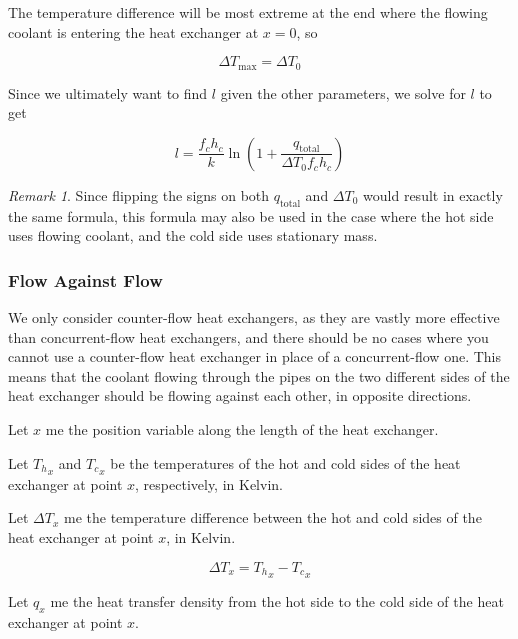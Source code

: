 \documentclass{article}
\numberwithin{equation}{subsection}
\theoremstyle{remark}
\newtheorem*{remark}{Remark}
\newcommand{\qtotal}{q_{\mathrm{total}}}
\newcommand{\DeltaT}{\Delta{}T}
\newcommand{\DeltaTmax}{\DeltaT_{\mathrm{max}}}
\begin{document}
The temperature difference will be most extreme at the end where the flowing coolant is entering the heat exchanger at \(x = 0\), so

\begin{equation}
\DeltaTmax = \DeltaT_{0}
\end{equation}

Since we ultimately want to find \(l\) given the other parameters, we solve for \(l\) to get

\begin{equation}
l = \frac{f_{c} h_{c}}{k} \ln \left(1 + \frac{\qtotal}{\DeltaT_{0} f_{c} h_{c}}\right)
\end{equation}

\begin{remark}
Since flipping the signs on both \(\qtotal\) and \(\DeltaT_{0}\) would result in exactly the same formula, this formula may also be used in the case where the hot side uses flowing coolant, and the cold side uses stationary mass.
\end{remark}

\subsubsection{Flow Against Flow}

We only consider counter-flow heat exchangers, as they are vastly more effective than concurrent-flow heat exchangers, and there should be no cases where you cannot use a counter-flow heat exchanger in place of a concurrent-flow one.
This means that the coolant flowing through the pipes on the two different sides of the heat exchanger should be flowing against each other, in opposite directions.

Let \(x\) me the position variable along the length of the heat exchanger.

Let \({T_{h}}_{x}\) and \({T_{c}}_{x}\) be the temperatures of the hot and cold sides of the heat exchanger at point \(x\), respectively, in Kelvin.

Let \(\DeltaT_{x}\) me the temperature difference between the hot and cold sides of the heat exchanger at point \(x\), in Kelvin.

\begin{equation}
\DeltaT_{x} = {T_{h}}_{x} - {T_{c}}_{x}
\end{equation}

Let \(q_{x}\) me the heat transfer density from the hot side to the cold side of the heat exchanger at point \(x\).
\end{document}
